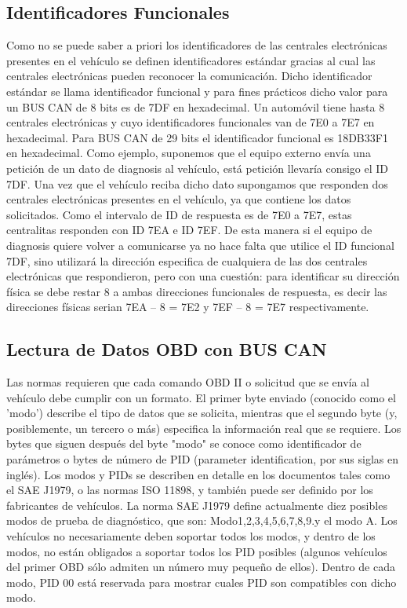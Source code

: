 \subsection {Identificadores Funcionales}
Como no se puede saber a priori los identificadores de las centrales electrónicas presentes en el vehículo se definen identificadores estándar gracias al cual las centrales electrónicas pueden reconocer la comunicación.  Dicho identificador estándar se llama identificador funcional y para fines prácticos dicho valor para un BUS CAN de 8 bits es de 7DF en hexadecimal. Un automóvil tiene hasta 8 centrales electrónicas y cuyo identificadores funcionales van de 7E0 a 7E7 en hexadecimal.  Para BUS CAN de 29 bits el identificador funcional es 18DB33F1 en hexadecimal. 
Como ejemplo, suponemos que el equipo externo envía una petición de un dato de diagnosis al vehículo, está petición llevaría consigo el ID 7DF. Una vez que el vehículo reciba dicho dato supongamos que responden dos centrales electrónicas presentes en el vehículo, ya que contiene los datos solicitados. Como el intervalo de ID de respuesta es de 7E0 a 7E7, estas centralitas responden con ID 7EA e ID 7EF. De esta manera si el equipo de diagnosis quiere volver a comunicarse ya no hace falta que utilice el ID funcional 7DF, sino utilizará la dirección especifica de cualquiera de las dos centrales electrónicas que respondieron, pero con una cuestión: para identificar su dirección física se debe restar 8 a ambas direcciones funcionales de respuesta, es decir las direcciones físicas serian 7EA – 8 = 7E2 y 7EF – 8 = 7E7 respectivamente.  

\subsection {Lectura de Datos OBD con BUS CAN}

Las normas requieren que cada comando OBD II o solicitud que se envía al vehículo debe cumplir con un formato. El primer byte enviado (conocido como el 'modo') describe el tipo de datos que se solicita, mientras que el segundo byte (y, posiblemente, un tercero o más) especifica la información real que se requiere.
Los bytes que siguen después del byte "modo" se conoce como  identificador de parámetros o bytes de número de PID (parameter identification, por sus siglas en inglés). Los modos y PIDs se describen en detalle en los documentos tales como el SAE J1979, o las normas ISO 11898, y también puede ser definido por los fabricantes de vehículos. La norma SAE J1979 define actualmente diez posibles modos de prueba de diagnóstico, que son:
Modo1,2,3,4,5,6,7,8,9.y el modo A.
Los vehículos no necesariamente deben soportar todos los modos, y dentro de los modos, no están obligados a soportar todos los PID posibles (algunos vehículos del primer OBD sólo admiten un número muy pequeño de ellos). 
Dentro de cada modo, PID 00 está reservada para mostrar cuales PID son compatibles con dicho modo.


